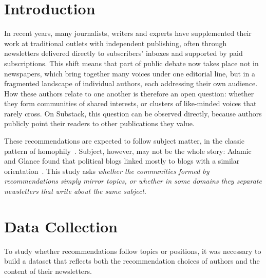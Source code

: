 \documentclass[sigchi]{acmart}
\begin{document}
%


%
\maketitle

\section{Introduction}
In recent years, many journalists, writers and experts have supplemented their work at traditional outlets with independent
publishing, often through newsletters delivered directly to subscribers' inboxes and supported by paid subscriptions. This shift means that part of public debate now takes place not in newspapers, which bring together many voices under one editorial line,
but in a fragmented landscape of individual authors, each addressing
their own audience. How these authors relate to one another is therefore an open question: whether they form communities of shared interests, or clusters of like-minded voices that rarely cross. On Substack, this
question can be observed directly, because authors publicly point their readers to other publications they value.

These recommendations are expected to follow subject matter, in the classic pattern of homophily~\cite{mcpherson2001birds}. Subject,
however, may not be the whole story: Adamic and Glance found that political blogs linked mostly to blogs with a similar orientation~\cite{adamic2005political}. This study asks \emph{whether the communities formed by recommendations simply mirror topics, or
whether in some domains they separate newsletters that write about the same subject}.


\section{Data Collection}
\label{sec:datacollection}
To study whether recommendations follow topics or positions, it was necessary to build a dataset that reflects both the recommendation choices of authors and the content of their newsletters.
\end{document}
